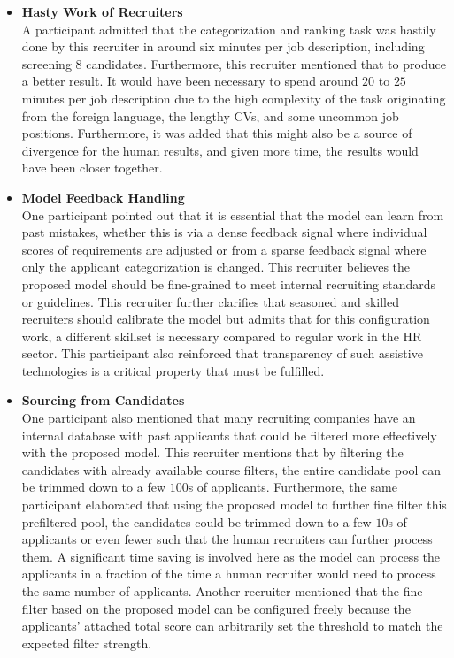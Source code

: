 \documentclass[draft,final]{thesisclass} %
\begin{document}
\begin{enumerate}
\begin{itemize}
        \item \textbf{Hasty Work of Recruiters}\\
        A participant admitted that the categorization and ranking task was hastily done by this recruiter in around six minutes per job description, including screening $8$ candidates. Furthermore, this recruiter mentioned that to produce a better result. It would have been necessary to spend around $20$ to $25$ minutes per job description due to the high complexity of the task originating from the foreign language, the lengthy \acs{CV}s, and some uncommon job positions. Furthermore, it was added that this might also be a source of divergence for the human results, and given more time, the results would have been closer together.
        \item \textbf{Model Feedback Handling}\\
        One participant pointed out that it is essential that the model can learn from past mistakes, whether this is via a dense feedback signal where individual scores of requirements are adjusted or from a sparse feedback signal where only the applicant categorization is changed. This recruiter believes the proposed model should be fine-grained to meet internal recruiting standards or guidelines. This recruiter further clarifies that seasoned and skilled recruiters should calibrate the model but admits that for this configuration work, a different skillset is necessary compared to regular work in the \acs{HR} sector. This participant also reinforced that transparency of such assistive technologies is a critical property that must be fulfilled.
        \item \textbf{Sourcing from Candidates}\\
        One participant also mentioned that many recruiting companies have an internal database with past applicants that could be filtered more effectively with the proposed model. This recruiter mentions that by filtering the candidates with already available course filters, the entire candidate pool can be trimmed down to a few $100$s of applicants. Furthermore, the same participant elaborated that using the proposed model to further fine filter this prefiltered pool, the candidates could be trimmed down to a few $10$s of applicants or even fewer such that the human recruiters can further process them. A significant time saving is involved here as the model can process the applicants in a fraction of the time a human recruiter would need to process the same number of applicants. Another recruiter mentioned that the fine filter based on the proposed model can be configured freely because the applicants' attached total score can arbitrarily set the threshold to match the expected filter strength.

\end{itemize}
\end{enumerate}
\end{document}
